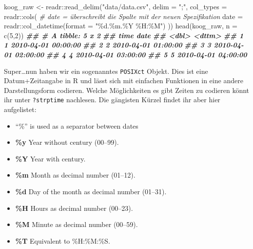 \documentclass[
]{article}
\newenvironment{Shaded}{\begin{snugshade}}{\end{snugshade}}
\newcommand{\AttributeTok}[1]{\textcolor[rgb]{0.77,0.63,0.00}{#1}}
\newcommand{\CommentTok}[1]{\textcolor[rgb]{0.56,0.35,0.01}{\textit{#1}}}
\newcommand{\DecValTok}[1]{\textcolor[rgb]{0.00,0.00,0.81}{#1}}
\newcommand{\DocumentationTok}[1]{\textcolor[rgb]{0.56,0.35,0.01}{\textbf{\textit{#1}}}}
\newcommand{\FunctionTok}[1]{\textcolor[rgb]{0.00,0.00,0.00}{#1}}
\newcommand{\NormalTok}[1]{#1}
\newcommand{\OtherTok}[1]{\textcolor[rgb]{0.56,0.35,0.01}{#1}}
\newcommand{\SpecialCharTok}[1]{\textcolor[rgb]{0.00,0.00,0.00}{#1}}
\newcommand{\StringTok}[1]{\textcolor[rgb]{0.31,0.60,0.02}{#1}}
\providecommand{\tightlist}{%
  \setlength{\itemsep}{0pt}\setlength{\parskip}{0pt}}
\begin{document}
\begin{Shaded}
\begin{Highlighting}[]
\NormalTok{koog\_raw }\OtherTok{\textless{}{-}}\NormalTok{ readr}\SpecialCharTok{::}\FunctionTok{read\_delim}\NormalTok{(}\StringTok{"data/data.csv"}\NormalTok{, }\AttributeTok{delim =} \StringTok{";"}\NormalTok{, }
                          \AttributeTok{col\_types =}\NormalTok{ readr}\SpecialCharTok{::}\FunctionTok{cols}\NormalTok{(}
                            \CommentTok{\# date = überschreibt die Spalte mit der neuen Spezifikation}
                            \AttributeTok{date =}\NormalTok{ readr}\SpecialCharTok{::}\FunctionTok{col\_datetime}\NormalTok{(}\AttributeTok{format =} \StringTok{"\%d.\%m.\%Y \%H:\%M"}\NormalTok{) }
\NormalTok{  ))}
\FunctionTok{head}\NormalTok{(koog\_raw, }\AttributeTok{n =} \FunctionTok{c}\NormalTok{(}\DecValTok{5}\NormalTok{,}\DecValTok{2}\NormalTok{))}
\DocumentationTok{\#\# \# A tibble: 5 x 2}
\DocumentationTok{\#\#    time date               }
\DocumentationTok{\#\#   \textless{}dbl\textgreater{} \textless{}dttm\textgreater{}             }
\DocumentationTok{\#\# 1     1 2010{-}04{-}01 00:00:00}
\DocumentationTok{\#\# 2     2 2010{-}04{-}01 01:00:00}
\DocumentationTok{\#\# 3     3 2010{-}04{-}01 02:00:00}
\DocumentationTok{\#\# 4     4 2010{-}04{-}01 03:00:00}
\DocumentationTok{\#\# 5     5 2010{-}04{-}01 04:00:00}
\end{Highlighting}
\end{Shaded}

Super\ldots nun haben wir ein sogenanntes \texttt{POSIXct} Objekt. Dies ist eine Datum+Zeitangabe in R und lässt sich mit einfachen Funktionen in eine andere Darstellungsform codieren. Welche Möglichkeiten es gibt Zeiten zu codieren könnt ihr unter \texttt{?strptime} nachlesen. Die gängisten Kürzel findet ihr aber hier aufgelistet:

\begin{itemize}
\tightlist
\item
  ``\%'' is used as a separator between dates 🚨
\item
  \textbf{\%y} Year without century (00--99).
\item
  \textbf{\%Y} Year with century.
\item
  \textbf{\%m} Month as decimal number (01--12).
\item
  \textbf{\%d} Day of the month as decimal number (01--31).
\item
  \textbf{\%H} Hours as decimal number (00--23).
\item
  \textbf{\%M} Minute as decimal number (00--59).
\item
  \textbf{\%T} Equivalent to \%H:\%M:\%S.
\end{itemize}
\end{document}
